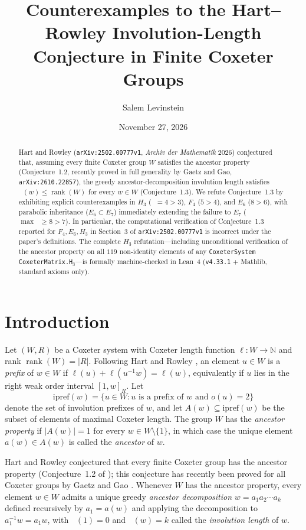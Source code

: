\documentclass[11pt,a4paper]{article}
\title{Counterexamples to the Hart--Rowley Involution-Length Conjecture in Finite Coxeter Groups}
\author{Salem Levinstein}
\date{November 27, 2026}
\DeclareMathOperator{\ilen}{\ell_{\mathrm{inv}}}
\DeclareMathOperator{\rank}{rank}
\begin{document}
\maketitle

\begin{abstract}
Hart and Rowley (\texttt{arXiv:2502.00777v1}, \emph{Archiv der Mathematik} 2026) conjectured that, assuming every finite Coxeter group $W$ satisfies the ancestor property (Conjecture~1.2, recently proved in full generality by Gaetz and Gao, \texttt{arXiv:2610.22857}), the greedy ancestor-decomposition involution length satisfies $\ilen(w) \le \rank(W)$ for every $w \in W$ (Conjecture~1.3). We refute Conjecture~1.3 by exhibiting explicit counterexamples in $H_3$ ($\ilen = 4 > 3$), $F_4$ ($5 > 4$), and $E_6$ ($8 > 6$), with parabolic inheritance ($E_6 \subset E_7$) immediately extending the failure to $E_7$ ($\max \ilen \ge 8 > 7$). In particular, the computational verification of Conjecture~1.3 reported for $F_4, E_6, H_3$ in Section~3 of \texttt{arXiv:2502.00777v1} is incorrect under the paper's definitions. The complete $H_3$ refutation---including unconditional verification of the ancestor property on all $119$ non-identity elements of any \texttt{CoxeterSystem CoxeterMatrix.H$_3$}---is formally machine-checked in Lean~4 (\texttt{v4.33.1} + Mathlib, standard axioms only).
\end{abstract}

\section{Introduction}

Let $(W, R)$ be a Coxeter system with Coxeter length function $\ell : W \to \mathbb{N}$ and rank $\rank(W) = |R|$. Following Hart and Rowley \cite{HartRowley2025}, an element $u \in W$ is a \emph{prefix} of $w \in W$ if $\ell(u) + \ell(u^{-1}w) = \ell(w)$, equivalently if $u$ lies in the right weak order interval $[1, w]_R$. Let
\[
\mathrm{ipref}(w) = \{u \in W : u \text{ is a prefix of } w \text{ and } o(u) = 2\}
\]
denote the set of involution prefixes of $w$, and let $A(w) \subseteq \mathrm{ipref}(w)$ be the subset of elements of maximal Coxeter length. The group $W$ has the \emph{ancestor property} if $|A(w)| = 1$ for every $w \in W \setminus \{1\}$, in which case the unique element $a(w) \in A(w)$ is called the \emph{ancestor} of $w$.

Hart and Rowley conjectured that every finite Coxeter group has the ancestor property (Conjecture~1.2 of \cite{HartRowley2025}); this conjecture has recently been proved for all Coxeter groups by Gaetz and Gao \cite{GaetzGao2026}. Whenever $W$ has the ancestor property, every element $w \in W$ admits a unique greedy \emph{ancestor decomposition} $w = a_1 a_2 \cdots a_k$ defined recursively by $a_1 = a(w)$ and applying the decomposition to $a_1^{-1} w = a_1 w$, with $\ilen(1) = 0$ and $\ilen(w) = k$ called the \emph{involution length} of $w$.
\end{document}
